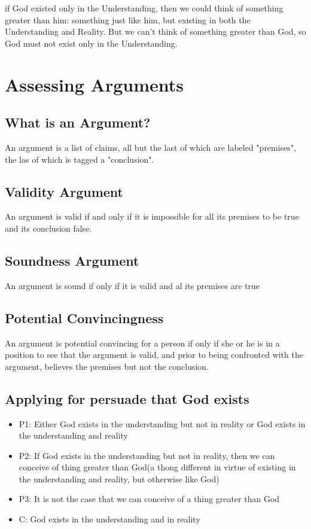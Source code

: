 \documentclass{article}
\begin{document}
if God existed only in the Understanding, then we could think of something greater than him: something just like him, but existing in both the Understanding and Reality. But we can't think of something greater than God, so God must not exist only in the Understanding.

\pagebreak


\section{Assessing Arguments}

\subsection{What is an Argument?}
An argument is a list of claims, all but the last of which are labeled "premises", the las of which is tagged a "conclusion".

\subsection{Validity Argument}
An argument is valid if and only if it is impossible for all its premises to be true and its conclusion false.


\subsection{Soundness Argument}
An argument is sound if only if it is valid and al its premises are true

\subsection{Potential Convincingness}
An argument is potential convincing for a person if only if she or he is in a position to see that the argument is valid, and prior to being confronted with the argument, believes the premises but not the conclusion.

\subsection{Applying for persuade that God exists}
\begin{itemize}
\item{P1: Either God exists in the understanding but not in reality or God exists in the understanding and reality}
\item{P2: If God exists in the understanding but not in reality, then we can conceive of thing greater than God(a thong different in virtue of existing in the understanding and reality, but otherwise like God)}
\item{P3: It is not the case that we can conceive of a thing greater than God}

\item{C: God exists in the understanding and in reality}
\end{itemize}
\end{document}
